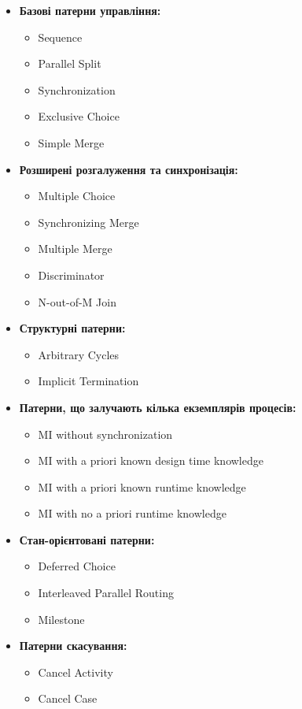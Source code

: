\documentclass{memoir}
\begin{document}
\begin{itemize}
    \item \textbf{Базові патерни управління:}
    \begin{itemize}
        \item Sequence
        \item Parallel Split
        \item Synchronization
        \item Exclusive Choice
        \item Simple Merge
    \end{itemize}
    \item \textbf{Розширені розгалуження та синхронізація:}
    \begin{itemize}
        \item Multiple Choice
        \item Synchronizing Merge
        \item Multiple Merge
        \item Discriminator
        \item N-out-of-M Join
    \end{itemize}
    \item \textbf{Структурні патерни:}
    \begin{itemize}
        \item Arbitrary Cycles
        \item Implicit Termination
    \end{itemize}
    \item \textbf{Патерни, що залучають кілька екземплярів процесів:}
    \begin{itemize}
        \item MI without synchronization
        \item MI with a priori known design time knowledge
        \item MI with a priori known runtime knowledge
        \item MI with no a priori runtime knowledge
    \end{itemize}
    \item \textbf{Стан-орієнтовані патерни:}
    \begin{itemize}
        \item Deferred Choice
        \item Interleaved Parallel Routing
        \item Milestone
    \end{itemize}
    \item \textbf{Патерни скасування:}
    \begin{itemize}
        \item Cancel Activity
        \item Cancel Case
    \end{itemize}
\end{itemize}
\end{document}
